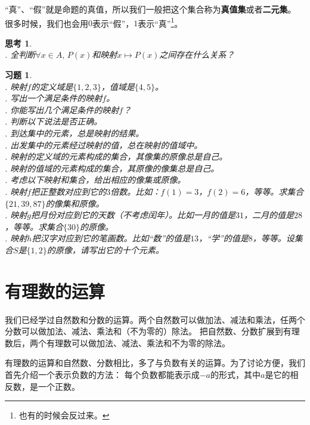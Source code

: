 \documentclass[12pt,UTF8]{ctexbook}
\theoremstyle{definition}
\theoremstyle{plain}
\newtheorem{sk}{思考}[section]
\newtheorem{xt}{习题}[section]
\begin{document}
“真”、“假”就是命题的真值，所以我们一般把这个集合称为\textbf{真值集}或者\textbf{二元集}。
很多时候，我们也会用$0$表示“假”，$1$表示“真”\footnote{也有的时候会反过来。}。

\begin{sk}\label{sk:2-2-0}
    \mbox{} \\
    . 全判断$\forall x \in A, \, P(x)$和映射$x \mapsto P(x)$之间存在什么关系？\\
\end{sk}

\begin{xt}\label{xt:2-2-0}
    \mbox{} \\
    . 映射$f$的定义域是$\{1,2,3\}$，值域是$\{4,5\}$。\\
    . 写出一个满足条件的映射$f$。\\
    . 你能写出几个满足条件的映射$f$？\\
    . 判断以下说法是否正确。\\
    . 到达集中的元素，总是映射的结果。\\
    . 出发集中的元素经过映射的值，总在映射的值域中。\\
    . 映射的定义域的元素构成的集合，其像集的原像总是自己。\\
    . 映射的值域的元素构成的集合，其原像的像集总是自己。\\
    . 考虑以下映射和集合，给出相应的像集或原像。\\
    . 映射$f$把正整数对应到它的$3$倍数。比如：$f(1) = 3$，$f(2) = 6$，等等。求集合$\{21, 39, 87\}$的像集和原像。\\
    . 映射$g$把月份对应到它的天数（不考虑闰年）。比如一月的值是$31$，二月的值是$28$，等等。求集合$\{30\}$的原像。\\
    . 映射$h$把汉字对应到它的笔画数。比如“数”的值是$13$，“学”的值是$8$，等等。设集合$S$是$\{1,2\}$的原像，请写出它的十个元素。 %
\end{xt}

\chapter{有理数的运算}
我们已经学过自然数和分数的运算。两个自然数可以做加法、减法和乘法，任两个分数可以做加法、减法、乘法和（不为零的）除法。
把自然数、分数扩展到有理数后，两个有理数可以做加法、减法、乘法和不为零的除法。

有理数的运算和自然数、分数相比，多了与负数有关的运算。为了讨论方便，我们首先介绍一个表示负数的方法：
每个负数都能表示成$-a$的形式，其中$a$是它的相反数，是一个正数。
\end{document}
